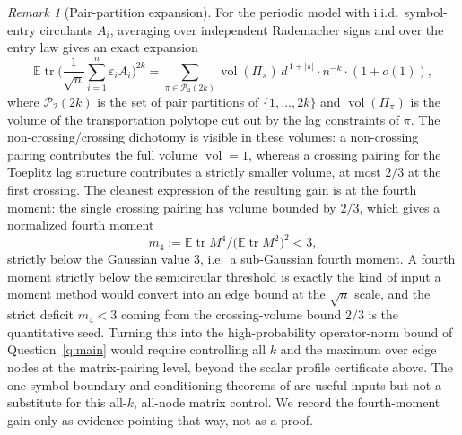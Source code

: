 \documentclass[11pt]{amsart}
\numberwithin{equation}{section}
\theoremstyle{definition}
\theoremstyle{remark}
\newtheorem{remark}[theorem]{Remark}
\newcommand{\Exp}{\mathbb E}
\newcommand{\abs}[1]{\left\lvert #1\right\rvert}
\newcommand{\eps}{\varepsilon}
\begin{document}
\begin{remark}[Pair-partition expansion]\label{rem:moments}
For the periodic model with i.i.d.\ symbol-entry circulants \(A_i\), averaging
over independent Rademacher signs and over the entry law gives an exact
expansion
\[
\Exp\operatorname{tr}\Big(\frac1{\sqrt n}\sum_{i=1}^n\eps_iA_i\Big)^{2k}
=\sum_{\pi\in\mathcal P_2(2k)}\operatorname{vol}(\Pi_\pi)\,d^{\,1+\abs{\pi}}
\cdot n^{-k}\cdot(1+o(1)),
\]
where $\mathcal P_2(2k)$ is the set of pair partitions of $\{1,\ldots,2k\}$ and
$\operatorname{vol}(\Pi_\pi)$ is the volume of the transportation polytope cut out
by the lag constraints of $\pi$. The non-crossing/crossing dichotomy is visible
in these volumes: a non-crossing pairing contributes the full volume
$\operatorname{vol}=1$, whereas a crossing pairing for the Toeplitz lag structure
contributes a strictly smaller volume, at most $2/3$ at the first crossing. The
cleanest expression of the resulting gain is at the fourth moment: the single
crossing pairing has volume bounded by $2/3$, which gives a normalized fourth
moment
\[
m_4:=\Exp\operatorname{tr}M^4\Big/\big(\Exp\operatorname{tr}M^2\big)^2<3,
\]
strictly below the Gaussian value $3$, i.e.\ a sub-Gaussian fourth moment. A
fourth moment strictly below the semicircular threshold is exactly the kind of
input a moment method would convert into an edge bound at the $\sqrt n$ scale, and
the strict deficit $m_4<3$ coming from the crossing-volume bound $2/3$ is the
quantitative seed. Turning this into the high-probability operator-norm bound of
Question~\ref{q:main} would require controlling all \(k\) and the maximum
over edge nodes at the matrix-pairing level, beyond the scalar profile
certificate above.  The one-symbol boundary and conditioning theorems of
\cite{Shmalo-paper16} are useful inputs but not a substitute for this all-\(k\),
all-node matrix control.  We record the fourth-moment gain only as evidence
pointing that way, not as a proof.
\end{remark}
\end{document}
